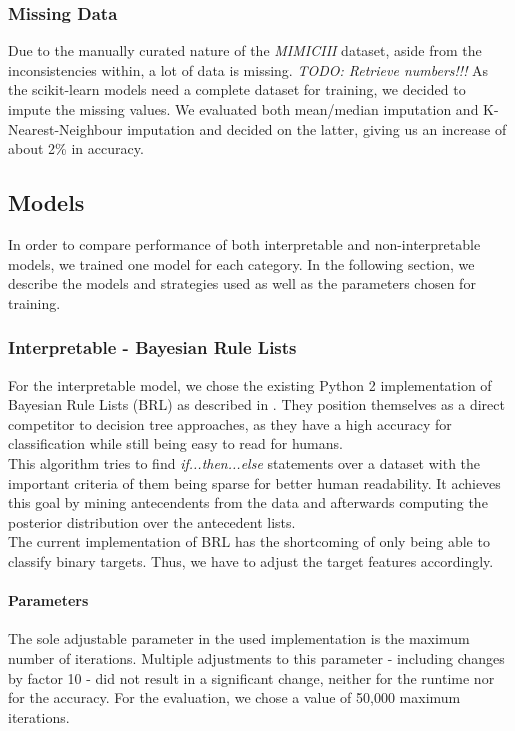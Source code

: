 \documentclass[conference,comsoc]{IEEEtran}
\begin{document}
\subsubsection{Missing Data}
Due to the manually curated nature of the \emph{MIMICIII} dataset, aside from the inconsistencies within, a lot of data is missing. 
\emph{TODO: Retrieve numbers!!!}
As the scikit-learn models need a complete dataset for training, we decided to impute the missing values. 
We evaluated both mean/median imputation and K-Nearest-Neighbour imputation and decided on the latter, giving us an increase of about 2\% in accuracy.


\subsection{Models}
In order to compare performance of both interpretable and non-interpretable models, we trained one model for each category. 
In the following section, we describe the models and strategies used as well as the parameters chosen for training.

\subsubsection{Interpretable - Bayesian Rule Lists}
For the interpretable model, we chose the existing Python 2 implementation of Bayesian Rule Lists (BRL) as described in \cite{Letham2015}. 
They position themselves as a direct competitor to decision tree approaches, as they have a high accuracy for classification while still being easy to read for humans. \\
This algorithm tries to find \emph{if...then...else} statements over a dataset with the important criteria of them being sparse for better human readability. 
It achieves this goal by mining antecendents from the data and afterwards computing the posterior distribution over the antecedent lists.\\
The current implementation of BRL has the shortcoming of only being able to classify binary targets. 
Thus, we have to adjust the target features accordingly.
\paragraph{Parameters}
The sole adjustable parameter in the used implementation is the maximum number of iterations. 
Multiple adjustments to this parameter - including changes by factor 10 - did not result in a significant change, neither for the runtime nor for the accuracy. 
For the evaluation, we chose a value of 50,000 maximum iterations.
\end{document}
